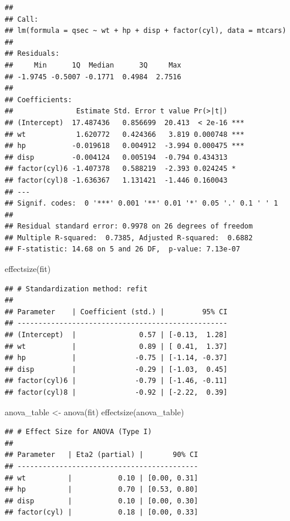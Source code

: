 \documentclass[
]{article}
\newenvironment{Shaded}{\begin{snugshade}}{\end{snugshade}}
\newcommand{\FunctionTok}[1]{\textcolor[rgb]{0.00,0.00,0.00}{#1}}
\newcommand{\NormalTok}[1]{#1}
\newcommand{\OtherTok}[1]{\textcolor[rgb]{0.56,0.35,0.01}{#1}}
\begin{document}
\begin{verbatim}
## 
## Call:
## lm(formula = qsec ~ wt + hp + disp + factor(cyl), data = mtcars)
## 
## Residuals:
##     Min      1Q  Median      3Q     Max 
## -1.9745 -0.5007 -0.1771  0.4984  2.7516 
## 
## Coefficients:
##               Estimate Std. Error t value Pr(>|t|)    
## (Intercept)  17.487436   0.856699  20.413  < 2e-16 ***
## wt            1.620772   0.424366   3.819 0.000748 ***
## hp           -0.019618   0.004912  -3.994 0.000475 ***
## disp         -0.004124   0.005194  -0.794 0.434313    
## factor(cyl)6 -1.407378   0.588219  -2.393 0.024245 *  
## factor(cyl)8 -1.636367   1.131421  -1.446 0.160043    
## ---
## Signif. codes:  0 '***' 0.001 '**' 0.01 '*' 0.05 '.' 0.1 ' ' 1
## 
## Residual standard error: 0.9978 on 26 degrees of freedom
## Multiple R-squared:  0.7385, Adjusted R-squared:  0.6882 
## F-statistic: 14.68 on 5 and 26 DF,  p-value: 7.13e-07
\end{verbatim}

\begin{Shaded}
\begin{Highlighting}[]
\FunctionTok{effectsize}\NormalTok{(fit)}
\end{Highlighting}
\end{Shaded}

\begin{verbatim}
## # Standardization method: refit
## 
## Parameter    | Coefficient (std.) |         95% CI
## --------------------------------------------------
## (Intercept)  |               0.57 | [-0.13,  1.28]
## wt           |               0.89 | [ 0.41,  1.37]
## hp           |              -0.75 | [-1.14, -0.37]
## disp         |              -0.29 | [-1.03,  0.45]
## factor(cyl)6 |              -0.79 | [-1.46, -0.11]
## factor(cyl)8 |              -0.92 | [-2.22,  0.39]
\end{verbatim}

\begin{Shaded}
\begin{Highlighting}[]
\NormalTok{anova\_table }\OtherTok{\textless{}{-}} \FunctionTok{anova}\NormalTok{(fit)}
\FunctionTok{effectsize}\NormalTok{(anova\_table)}
\end{Highlighting}
\end{Shaded}

\begin{verbatim}
## # Effect Size for ANOVA (Type I)
## 
## Parameter   | Eta2 (partial) |       90% CI
## -------------------------------------------
## wt          |           0.10 | [0.00, 0.31]
## hp          |           0.70 | [0.53, 0.80]
## disp        |           0.10 | [0.00, 0.30]
## factor(cyl) |           0.18 | [0.00, 0.33]
\end{verbatim}
\end{document}
